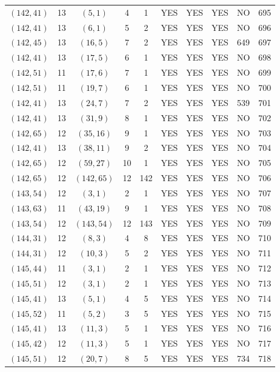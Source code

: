 \begin{longtable}{|c|c|c|c|c|c|c|c|c|c|}
$(142, 41)$ & 13 & $(5, 1)$ & 4 & 1 & YES & YES & YES & NO & 695\\
$(142, 41)$ & 13 & $(6, 1)$ & 5 & 2 & YES & YES & YES & NO & 696\\
$(142, 45)$ & 13 & $(16, 5)$ & 7 & 2 & YES & YES & YES & 649 & 697\\
$(142, 41)$ & 13 & $(17, 5)$ & 6 & 1 & YES & YES & YES & NO & 698\\
$(142, 51)$ & 11 & $(17, 6)$ & 7 & 1 & YES & YES & YES & NO & 699\\
$(142, 51)$ & 11 & $(19, 7)$ & 6 & 1 & YES & YES & YES & NO & 700\\
$(142, 41)$ & 13 & $(24, 7)$ & 7 & 2 & YES & YES & YES & 539 & 701\\
$(142, 41)$ & 13 & $(31, 9)$ & 8 & 1 & YES & YES & YES & NO & 702\\
$(142, 65)$ & 12 & $(35, 16)$ & 9 & 1 & YES & YES & YES & NO & 703\\
$(142, 41)$ & 13 & $(38, 11)$ & 9 & 2 & YES & YES & YES & NO & 704\\
$(142, 65)$ & 12 & $(59, 27)$ & 10 & 1 & YES & YES & YES & NO & 705\\
$(142, 65)$ & 12 & $(142, 65)$ & 12 & 142 & YES & YES & YES & NO & 706\\
$(143, 54)$ & 12 & $(3, 1)$ & 2 & 1 & YES & YES & YES & NO & 707\\
$(143, 63)$ & 11 & $(43, 19)$ & 9 & 1 & YES & YES & YES & NO & 708\\
$(143, 54)$ & 12 & $(143, 54)$ & 12 & 143 & YES & YES & YES & NO & 709\\
$(144, 31)$ & 12 & $(8, 3)$ & 4 & 8 & YES & YES & YES & NO & 710\\
$(144, 31)$ & 12 & $(10, 3)$ & 5 & 2 & YES & YES & YES & NO & 711\\
$(145, 44)$ & 11 & $(3, 1)$ & 2 & 1 & YES & YES & YES & NO & 712\\
$(145, 51)$ & 12 & $(3, 1)$ & 2 & 1 & YES & YES & YES & NO & 713\\
$(145, 41)$ & 13 & $(5, 1)$ & 4 & 5 & YES & YES & YES & NO & 714\\
$(145, 52)$ & 11 & $(5, 2)$ & 3 & 5 & YES & YES & YES & NO & 715\\
$(145, 41)$ & 13 & $(11, 3)$ & 5 & 1 & YES & YES & YES & NO & 716\\
$(145, 42)$ & 12 & $(11, 3)$ & 5 & 1 & YES & YES & YES & NO & 717\\
$(145, 51)$ & 12 & $(20, 7)$ & 8 & 5 & YES & YES & YES & 734 & 718\\

\end{longtable}
